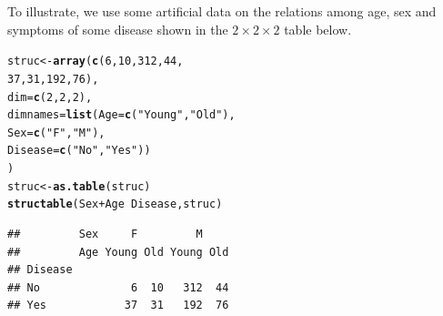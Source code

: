 \documentclass[11pt]{book}\usepackage[]{graphicx}\usepackage[]{color}
\makeatletter
\newcommand{\hlnum}[1]{\textcolor[rgb]{0.686,0.059,0.569}{#1}}%
\newcommand{\hlstr}[1]{\textcolor[rgb]{0.192,0.494,0.8}{#1}}%
\newcommand{\hlopt}[1]{\textcolor[rgb]{0,0,0}{#1}}%
\newcommand{\hlstd}[1]{\textcolor[rgb]{0.345,0.345,0.345}{#1}}%
\newcommand{\hlkwb}[1]{\textcolor[rgb]{0.69,0.353,0.396}{#1}}%
\newcommand{\hlkwc}[1]{\textcolor[rgb]{0.333,0.667,0.333}{#1}}%
\newcommand{\hlkwd}[1]{\textcolor[rgb]{0.737,0.353,0.396}{\textbf{#1}}}%
\newenvironment{kframe}{%
 \def\at@end@of@kframe{}%
 \ifinner\ifhmode%
  \def\at@end@of@kframe{\end{minipage}}%
  \begin{minipage}{\columnwidth}%
 \fi\fi%
 \def\FrameCommand##1{\hskip\@totalleftmargin \hskip-\fboxsep
 \colorbox{shadecolor}{##1}\hskip-\fboxsep
     \hskip-\linewidth \hskip-\@totalleftmargin \hskip\columnwidth}%
 \MakeFramed {\advance\hsize-\width
   \@totalleftmargin\z@ \linewidth\hsize
   \@setminipage}}%
 {\par\unskip\endMakeFramed%
 \at@end@of@kframe}
\newenvironment{knitrout}{}{} %
\renewenvironment{knitrout}{\small\renewcommand{\baselinestretch}{.85}}{} %
\makeatother
\begin{document}
To illustrate, we use some artificial data on the relations among
age, sex and symptoms of some disease shown in the $2 \times 2 \times 2$ table
 below.
\begin{knitrout}
\color{fgcolor}\begin{kframe}
\begin{alltt}
\hlstd{struc} \hlkwb{<-} \hlkwd{array}\hlstd{(}\hlkwd{c}\hlstd{(}\hlnum{6}\hlstd{,} \hlnum{10}\hlstd{,} \hlnum{312}\hlstd{,} \hlnum{44}\hlstd{,}
                 \hlnum{37}\hlstd{,} \hlnum{31}\hlstd{,} \hlnum{192}\hlstd{,} \hlnum{76}\hlstd{),}
 \hlkwc{dim} \hlstd{=} \hlkwd{c}\hlstd{(}\hlnum{2}\hlstd{,}\hlnum{2}\hlstd{,}\hlnum{2}\hlstd{),}
 \hlkwc{dimnames} \hlstd{=} \hlkwd{list}\hlstd{(}\hlkwc{Age}\hlstd{=}\hlkwd{c}\hlstd{(}\hlstr{"Young"}\hlstd{,} \hlstr{"Old"}\hlstd{),}
                 \hlkwc{Sex}\hlstd{=}\hlkwd{c}\hlstd{(}\hlstr{"F"}\hlstd{,} \hlstr{"M"}\hlstd{),}
                 \hlkwc{Disease}\hlstd{=}\hlkwd{c}\hlstd{(}\hlstr{"No"}\hlstd{,} \hlstr{"Yes"}\hlstd{))}
 \hlstd{)}
\hlstd{struc} \hlkwb{<-} \hlkwd{as.table}\hlstd{(struc)}
\hlkwd{structable}\hlstd{(Sex}\hlopt{+}\hlstd{Age} \hlopt{~} \hlstd{Disease, struc)}
\end{alltt}
\begin{verbatim}
##         Sex     F         M    
##         Age Young Old Young Old
## Disease                        
## No              6  10   312  44
## Yes            37  31   192  76
\end{verbatim}
\end{kframe}
\end{knitrout}
\end{document}
